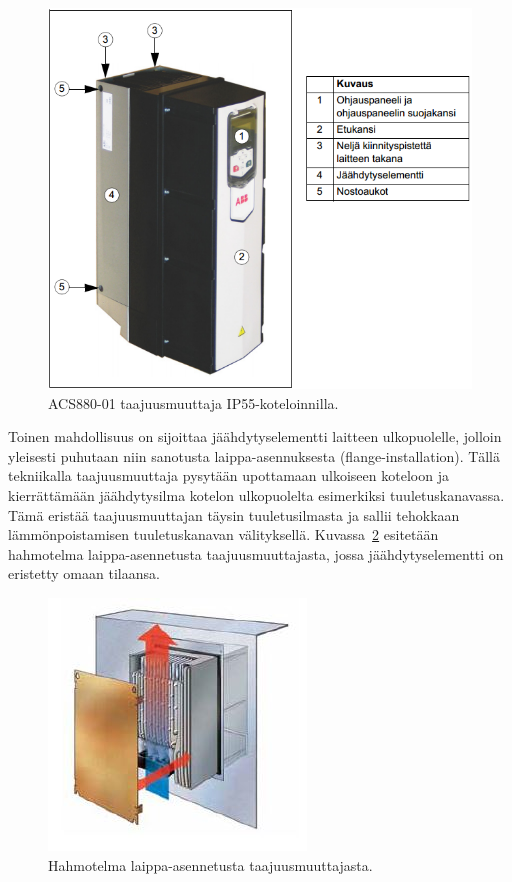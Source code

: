 \documentclass[finnish,12pt,a4paper,pdftex,elec,utf8]{aaltothesis}
\begin{document}
\begin{figure}[H]
	\begin{center}
	\includegraphics[scale=0.9]{IP55}
	\end{center}
	\caption{ACS880-01 taajuusmuuttaja IP55-koteloinnilla.
		 \cite[s. 28]{880hwman}}
	\label{fig:IP55}
\end{figure}

\noindent
Toinen mahdollisuus on sijoittaa jäähdytyselementti laitteen ulkopuolelle, jolloin yleisesti puhutaan niin sanotusta laippa-asennuksesta (flange-installation). Tällä tekniikalla taajuusmuuttaja pysytään upottamaan ulkoiseen koteloon ja kierrättämään jäähdytysilma kotelon ulkopuolelta esimerkiksi tuuletuskanavassa. Tämä eristää taajuusmuuttajan täysin tuuletusilmasta ja sallii tehokkaan lämmönpoistamisen tuuletuskanavan välityksellä. Kuvassa~\ref{fig:flange} esitetään hahmotelma laippa-asennetusta taajuusmuuttajasta, jossa jäähdytyselementti on eristetty omaan tilaansa.

\begin{figure}[H]
	\begin{center}
	\includegraphics{flange}
	\end{center}
	\caption{Hahmotelma laippa-asennetusta taajuusmuuttajasta.
		 \cite[s. 6]{danfoss}}
	\label{fig:flange}
\end{figure}
\end{document}

